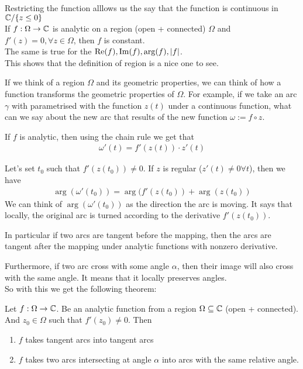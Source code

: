 Restricting the function alllows us the say that the function is continuous in $\mathbb{C}/\{z \leq 0\}$\\

If $f: \Omega \to \mathbb{C}$ is analytic on a region (open + connected) $\Omega$ and $f'(z) = 0, \forall z \in \Omega$, then $f$ is constant.\\
The same is true for the $\text{Re}(f), \operatorname{Im}(f), \arg(f), \vert f\vert$.\\

This shows that the definition of region is a nice one to see.


If we think of a region $\Omega$ and its geometric properties, we can think of how a function transforms the geometric properties of $\Omega$.
For example, if we take an arc $\gamma$ with parametrised with the function $z(t)$ under a continuous function, what can we say about the new arc that results of the new function $\omega := f \circ z$.

If $f$ is analytic, then using the chain rule we get that
\begin{align*}
	\omega'(t) = f'(z(t)) \cdot z'(t)
\end{align*}

Let's set $t_0$ such that $f'(z(t_0)) \neq 0$. If $z$ is regular ($z'(t) \neq 0 \forall t$), then we have
\begin{align*}
	\arg(\omega'(t_0)) = \arg(f'(z(t_0)) + \arg(z(t_0))
\end{align*}
We can think of $\arg(\omega'(t_0))$ as the direction the arc is moving. It says that locally, the original arc is turned according to the derivative $f'(z(t_0))$.

In particular if two arcs are tangent before the mapping, then the arcs are tangent after the mapping under analytic functions with nonzero derivative.

Furthermore, if two arc cross with some angle $\alpha$, then their image will also cross with the same angle. It means that it locally preserves angles.\\

So with this we get the following theorem:
\begin{theorem}[]
	Let $f: \Omega \to \mathbb{C}$. Be an analytic function from a region $\Omega \subseteq \mathbb{C}$ (open + connected). And $z_0 \in \Omega$ such that $f'(z_0) \neq 0$. Then
	\begin{enumerate}
	\item $f$ takes tangent arcs into tangent arcs
	\item $f$ takes two arcs intersecting at angle $\alpha$ into arcs with the same relative angle.
	\end{enumerate}
\end{theorem}


